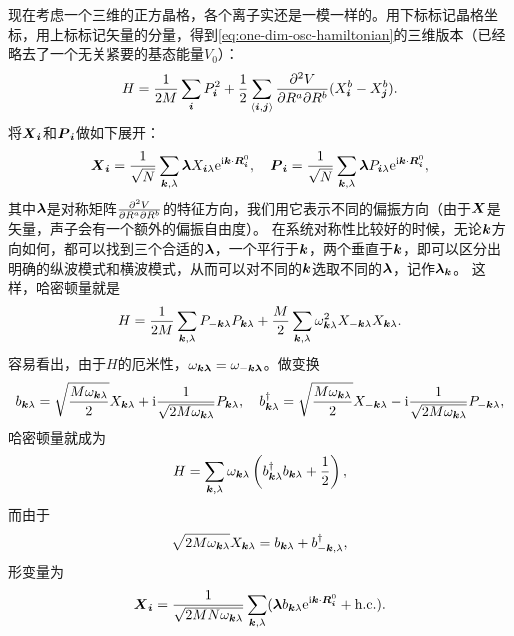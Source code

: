 现在考虑一个三维的正方晶格，各个离子实还是一模一样的。用下标标记晶格坐标，用上标标记矢量的分量，得到\eqref{eq:one-dim-osc-hamiltonian}的三维版本（已经略去了一个无关紧要的基态能量$V_0$）：
\begin{equation}
    {H} = \frac{1}{2 M} \sum_{\vb*{i}} {P}_{\vb*{i}}^2 + \frac{1}{2} \sum_{\langle \vb*{i}, \vb*{j} \rangle} \pdv{V}{R^a}{R^b} (X_{\vb*{i}}^a - X_{\vb*{j}}^a) (X_{\vb*{i}}^b - X_{\vb*{j}}^b).
\end{equation}
将$\vb*{X}_{\vb*{i}}$和$\vb*{P}_{\vb*{i}}$做如下展开：
\begin{equation}
    \vb*{X}_{\vb*{i}} = \frac{1}{\sqrt{N}} \sum_{\vb*{k}, \lambda} \vb*{\lambda} X_{\vb*{i} \lambda} \mathrm{e}^{\mathrm{i} \vb*{k} \cdot \vb*{R}_{\vb*{i}}^0}, \quad \vb*{P}_{\vb*{i}} = \frac{1}{\sqrt{N}} \sum_{\vb*{k}, \lambda} \vb*{\lambda} P_{\vb*{i} \lambda} \mathrm{e}^{\mathrm{i} \vb*{k} \cdot \vb*{R}_{\vb*{i}}^0},
\end{equation}
其中$\vb*{\lambda}$是对称矩阵$\pdv{V}{R^a}{R^b}$的特征方向，我们用它表示不同的偏振方向（由于$\vb*{X}$是矢量，声子会有一个额外的偏振自由度）。
在系统对称性比较好的时候，无论$\vb*{k}$方向如何，都可以找到三个合适的$\vb*{\lambda}$，一个平行于$\vb*{k}$，两个垂直于$\vb*{k}$，即可以区分出明确的纵波模式和横波模式，从而可以对不同的$\vb*{k}$选取不同的$\vb*{\lambda}$，记作$\vb*{\lambda}_{\vb*{k}}$。
这样，哈密顿量就是
\begin{equation}
    {H} = \frac{1}{2 M} \sum_{\vb*{k}, \lambda} {P}_{-\vb*{k} \lambda} {P}_{\vb*{k}\lambda} + \frac{M}{2} \sum_{\vb*{k}, \lambda} \omega_{\vb*{k} \lambda}^2 {X}_{-\vb*{k} \lambda} {X}_{\vb*{k} \lambda}.
\end{equation}
容易看出，由于${H}$的厄米性，$\omega_{\vb*{k}\vb*{\lambda}} = \omega_{-\vb*{k} \vb*{\lambda}}$。做变换
\begin{equation}
    {b}_{\vb*{k} \lambda} = \sqrt{\frac{M \omega_{\vb*{k} \lambda}}{2}} {X}_{\vb*{k} \lambda} + \mathrm{i} \frac{1}{\sqrt{2 M \omega_{\vb*{k} \lambda}}} P_{\vb*{k} \lambda}, \quad {b}^\dagger_{\vb*{k} \lambda} = \sqrt{\frac{M \omega_{\vb*{k} \lambda}}{2}} {X}_{- \vb*{k} \lambda} - \mathrm{i} \frac{1}{\sqrt{2 M \omega_{\vb*{k} \lambda}}} P_{- \vb*{k} \lambda},
    \label{eq:transform-b-pq}
\end{equation}
哈密顿量就成为
\begin{equation}
    {H} = \sum_{\vb*{k}, \lambda} \omega_{\vb*{k} \lambda} \left( {b}^\dagger_{\vb*{k} \lambda} {b}_{\vb*{k} \lambda} + \frac{1}{2} \right),
\end{equation}
而由于
\[
    \sqrt{2 M \omega_{\vb*{k} \lambda}} X_{\vb*{k} \lambda} = b_{\vb*{k} \lambda} + b^\dagger_{-\vb*{k}, \lambda},
\]
形变量为
\begin{equation}
    \vb*{X}_{\vb*{i}} = \frac{1}{\sqrt{2 M N \omega_{\vb*{k} \lambda}}} \sum_{\vb*{k}, \lambda} (\vb*{\lambda} b_{\vb*{k} \lambda} \mathrm{e}^{\mathrm{i} \vb*{k} \cdot \vb*{R}^0_{\vb*{i}}} + \text{h.c.}).
\end{equation}

